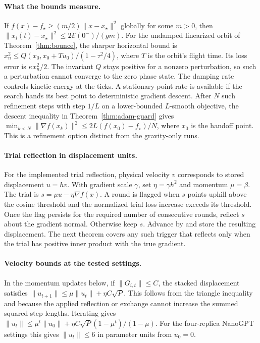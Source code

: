 \documentclass[10pt,letterpaper]{article}
\begin{document}
\paragraph{What the bounds measure.}
If \(f(x)-f_\star\ge (m/2)\|x-x_\star\|^2\) globally for some \(m>0\), then \(\|x_i(t)-x_\star\|^2\le 2\mathcal E(0^-)/(gm)\). For the undamped linearized orbit of Theorem~\ref{thm:bounce}, the sharper horizontal bound is \(x_n^2\le Q(x_0,x_0+Tu_0)/(1-\tau^2/4)\), where \(T\) is the orbit's flight time. Its loss error is \(\kappa x_n^2/2\). The invariant \(Q\) stays positive for a nonzero perturbation, so such a perturbation cannot converge to the zero phase state. The damping rate controls kinetic energy at the ticks. A stationary-point rate is available if the search hands its best point to deterministic gradient descent. After \(N\) such refinement steps with step \(1/L\) on a lower-bounded \(L\)-smooth objective, the descent inequality in Theorem~\ref{thm:adam-guard} gives \(\min_{k<N}\|\nabla f(x_k)\|^2\le 2L(f(x_0)-f_\star)/N\), where \(x_0\) is the handoff point. This is a refinement option distinct from the gravity-only runs.

\paragraph{Trial reflection in displacement units.}
For the implemented trial reflection, physical velocity \(v\) corresponds to stored displacement \(u=hv\). With gradient scale \(\gamma\), set \(\eta=\gamma h^2\) and momentum \(\mu=\beta\). The trial is \(s=\mu u-\eta\nabla f(x)\). A round is flagged when \(s\) points uphill above the cosine threshold and the normalized trial loss increase exceeds its threshold. Once the flag persists for the required number of consecutive rounds, reflect \(s\) about the gradient normal. Otherwise keep \(s\). Advance by and store the resulting displacement. The next theorem covers any such trigger that reflects only when the trial has positive inner product with the true gradient.

\paragraph{Velocity bounds at the tested settings.}
In the momentum updates below, if \(\|G_{i,t}\|\le C\), the stacked displacement satisfies \(\|u_{t+1}\|\le\mu\|u_t\|+\eta C\sqrt P\). This follows from the triangle inequality and because the applied reflection or exchange cannot increase the summed squared step lengths. Iterating gives \(\|u_t\|\le\mu^t\|u_0\|+\eta C\sqrt P(1-\mu^t)/(1-\mu)\). For the four-replica NanoGPT settings this gives \(\|u_t\|\le6\) in parameter units from \(u_0=0\).
\end{document}
